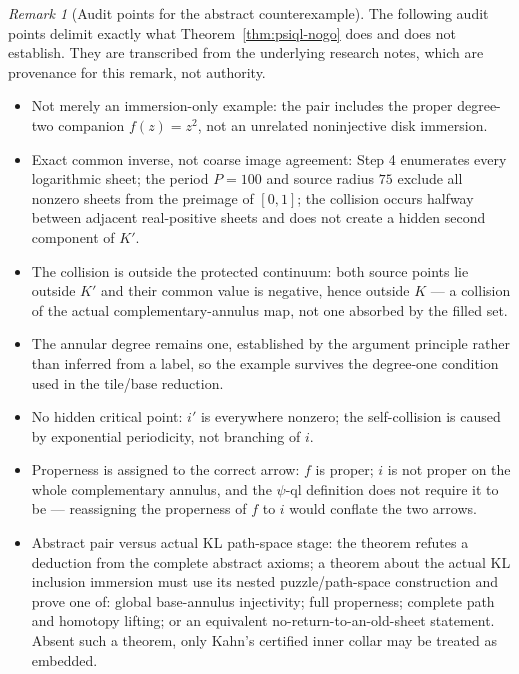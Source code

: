 \documentclass[11pt,reqno]{amsart}
\theoremstyle{definition}
\theoremstyle{remark}
\newtheorem{remark}[theorem]{Remark}
\begin{document}
\begin{remark}[Audit points for the abstract counterexample]\label{rem:psiql-audit}
The following audit points delimit exactly what
Theorem~\ref{thm:psiql-nogo} does and does not establish.  They are
transcribed from the underlying research notes, which are provenance
for this remark, not authority.
\begin{itemize}
\item Not merely an immersion-only example: the pair includes the proper degree-two companion \(f(z)=z^2\), not an unrelated noninjective disk immersion.
\item Exact common inverse, not coarse image agreement: Step 4 enumerates every logarithmic sheet; the period \(P=100\) and source radius \(75\) exclude all nonzero sheets from the preimage of \([0,1]\); the collision occurs halfway between adjacent real-positive sheets and does not create a hidden second component of \(K'\).
\item The collision is outside the protected continuum: both source points lie outside \(K'\) and their common value is negative, hence outside \(K\) --- a collision of the actual complementary-annulus map, not one absorbed by the filled set.
\item The annular degree remains one, established by the argument principle rather than inferred from a label, so the example survives the degree-one condition used in the tile/base reduction.
\item No hidden critical point: \(i'\) is everywhere nonzero; the self-collision is caused by exponential periodicity, not branching of \(i\).
\item Properness is assigned to the correct arrow: \(f\) is proper; \(i\) is not proper on the whole complementary annulus, and the \(\psi\)-ql definition does not require it to be --- reassigning the properness of \(f\) to \(i\) would conflate the two arrows.
\item Abstract pair versus actual KL path-space stage: the theorem refutes a deduction from the complete abstract axioms; a theorem about the actual KL inclusion immersion must use its nested puzzle/path-space construction and prove one of: global base-annulus injectivity; full properness; complete path and homotopy lifting; or an equivalent no-return-to-an-old-sheet statement.  Absent such a theorem, only Kahn's certified inner collar may be treated as embedded.
\end{itemize}
\end{remark}
\end{document}

